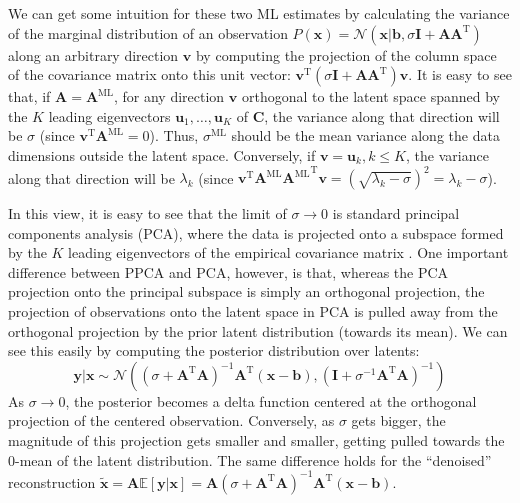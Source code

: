 \documentclass[a4paper]{article}
\begin{document}
We can get some intuition for these two ML estimates by calculating the variance of the marginal distribution of an observation $P(\mathbf{x}) = \mathcal{N}\left(\mathbf{x}|\mathbf{b},\sigma \mathbf{I} + \mathbf{AA}^\textrm{T}\right)$ along an arbitrary direction $\mathbf{v}$ by computing the projection of the column space of the covariance matrix onto this unit vector: $\mathbf{v}^\textrm{T}(\sigma \mathbf{I} + \mathbf{AA}^\textrm{T})\mathbf{v}$. It is easy to see that, if $\mathbf{A} = \mathbf{A}^\textrm{ML}$, for any direction $\mathbf{v}$ orthogonal to the latent space spanned by the $K$ leading eigenvectors $\mathbf{u}_1,\ldots,\mathbf{u}_K$ of $\mathbf{C}$, the variance along that direction will be $\sigma$ (since $\mathbf{v}^\textrm{T}\mathbf{A}^\textrm{ML} = 0$). Thus, $\sigma^\textrm{ML}$ should be the mean variance along the data dimensions outside the latent space. Conversely, if $\mathbf{v} = \mathbf{u}_k, k\leq K$, the variance along that direction will be $\lambda_k$ (since $\mathbf{v}^\textrm{T}\mathbf{A}^\textrm{ML}{\mathbf{A}^\textrm{ML}}^\textrm{T}\mathbf{v} = (\sqrt{\lambda_k - \sigma})^2 = \lambda_k - \sigma$).  

In this view, it is easy to see that the limit of $\sigma \rightarrow 0$ is standard principal components analysis (PCA), where the data is projected onto a subspace formed by the $K$ leading eigenvectors of the empirical covariance matrix . One important difference between PPCA and PCA, however, is that, whereas the PCA projection onto the principal subspace is simply an orthogonal projection, the projection of observations onto the latent space in PCA is pulled away from the orthogonal projection by the prior latent distribution (towards its mean). We can see this easily by computing the posterior distribution over latents:
\[ \mathbf{y}|\mathbf{x} \sim \mathcal{N}\left((\sigma + \mathbf{A}^\textrm{T}\mathbf{A})^{-1}\mathbf{A}^\textrm{T}(\mathbf{x-b}),(\mathbf{I} + \sigma^{-1}\mathbf{A}^\textrm{T}\mathbf{A})^{-1} \right) \]
As $\sigma \rightarrow 0$, the posterior becomes a delta function centered at the orthogonal projection of the centered observation. Conversely, as $\sigma$ gets bigger, the magnitude of this projection gets smaller and smaller, getting pulled towards the 0-mean of the latent distribution. The same difference holds for the ``denoised'' reconstruction $\tilde{\mathbf{x}} = \mathbf{A}\mathbb{E}[\mathbf{y}|\mathbf{x}] = \mathbf{A}(\sigma + \mathbf{A}^\textrm{T}\mathbf{A})^{-1}\mathbf{A}^\textrm{T}(\mathbf{x-b})$.
\end{document}
